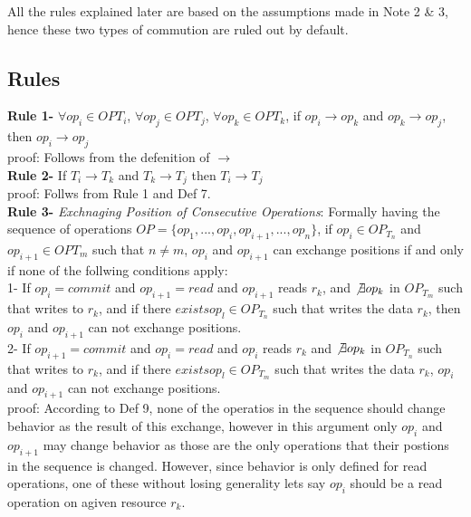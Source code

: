 \documentclass[a4paper, 11pt]{article}
\begin{document}
All the rules explained later are based on the assumptions made in Note 2 \& 3, hence these two types of commution are ruled out by default.\\



\subsection{Rules}

\textbf{Rule 1-} $\forall op_i \in  OP{T_i}$, $\forall op_j \in  OP{T_j}$, $\forall op_k \in  OP{T_k}$, if $op_i \rightarrow op_k$ and  $op_k \rightarrow op_j$, then $op_i \rightarrow op_j$ \\

proof: Follows from the defenition of $\rightarrow$ \\


\textbf{Rule 2-} If $T_i \rightarrow T_k$ and $T_k \rightarrow T_j$ then $T_i \rightarrow T_j$ \\

proof: Follws from Rule 1 and Def 7. \\ 

\textbf{Rule 3-} \emph{Exchnaging Position of Consecutive Operations}: Formally having the sequence of operations $OP = \{op_1,...,op_i,op_{i+1},...,op_n\}$, if $op_i \in OP_{T_n}$ and $op_{i+1} \in OP{T_m}$ such that $ n\neq m$, $op_i$ and $op_{i+1}$ can exchange positions if and only if none of the follwing conditions apply:\\

\hspace{8mm} 1- If $op_i = {commit}$ and $op_{i+1} = {read}$ and $op_{i+1}$ reads $r_k$, and $\not \exists op_k$ in $OP_{T_m}$ such that writes to $r_k$, and if there  $exists op_l \in OP_{T_n}$ such that writes the data $r_k$, then $op_i$ and $op_{i+1}$ can not exchange positions.\\ 

\hspace{8mm} 2- If $op_{i+1} = {commit}$ and $op_{i} = {read}$ and $op_{i}$ reads $r_k$ and $\not \exists op_k$ in $OP_{T_n}$ such that writes to $r_k$, and if there $exists op_l \in OP_{T_m}$ such that writes the data $r_k$, $op_i$ and $op_{i+1}$ can not exchange positions.\\ 


proof: According to Def 9, none of the operatios in the sequence should change behavior as the result of this exchange, however in this argument only $op_i$ and $op_{i+1}$ may change behavior as those are the only operations that their postions in the sequence is changed. However, since behavior is only defined for read operations, one of these without losing generality lets say $op_i$ should be a read operation on agiven resource $r_k$.\\
\end{document}
